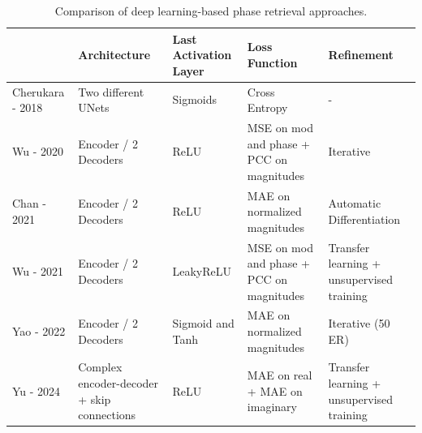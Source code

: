 \begin{table}[ht]
    \centering
    \scriptsize
    \renewcommand{\arraystretch}{1.5} %
    \begin{tabular}{l|P{3.2cm}|P{2.2cm}|P{4.3cm}|P{3cm}}
    \textbf{} & \textbf{Architecture} & \textbf{Last Activation Layer} & \textbf{Loss Function} & \textbf{Refinement} \\
    \hline
    Cherukara - 2018 \cite{cherukara_real-time_2018} & Two different UNets & Sigmoids & Cross Entropy & - \\
    Wu - 2020 \cite{Wu2021} & Encoder / 2 Decoders & ReLU & MSE on mod and phase + PCC on magnitudes & Iterative \\
    Chan - 2021 \cite{chan_rapid_2021} & Encoder / 2 Decoders & ReLU & MAE on normalized magnitudes & Automatic Differentiation \\
    Wu - 2021 \cite{wu_three-dimensional_2021} & Encoder / 2 Decoders & LeakyReLU & MSE on mod and phase + PCC on magnitudes & Transfer learning + unsupervised training \\
    Yao - 2022 \cite{yao_autophasenn_2022} & Encoder / 2 Decoders & Sigmoid and Tanh & MAE on normalized magnitudes & Iterative (50 ER) \\
    Yu - 2024 \cite{yu_ultrafast_2024} & Complex encoder-decoder + skip connections & ReLU & MAE on real + MAE on imaginary & Transfer learning + unsupervised training
    \end{tabular}
    \caption{Comparison of deep learning-based phase retrieval approaches.}
    \label{table:models}
\end{table}

